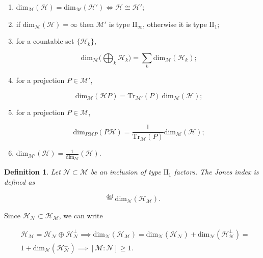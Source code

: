 \documentclass[a4paper,11pt]{article}
\newcommand{\eqdef}{\overset{\mathrm{def}}{=}}
\newtheorem{Definition}{Definition}[subsection]
\begin{document}
\begin{enumerate}
    \item $\mathrm{dim}_{\mathcal{M}} (\mathcal{H}) = \mathrm{dim}_{\mathcal{M}} (\mathcal{H}') \iff \mathcal{H} \cong \mathcal{H}'$;
    \item if $\mathrm{dim}_{\mathcal{M}} (\mathcal{H}) = \infty$ then $\mathcal{M}'$ is type $\mathrm{II}_{\infty}$, otherwise it is type $\mathrm{II}_1$;
    \item for a countable set $\{ \mathcal{H}_k \}$, 
    
    \begin{equation}
        \mathrm{dim}_{\mathcal{M}} \Big( \bigoplus_k \mathcal{H}_k \Big) = \sum_k \mathrm{dim}_{\mathcal{M}} (\mathcal{H}_k) \text{;}
    \end{equation}
    \item for a projection $P \in \mathcal{M}'$,
    
    \begin{equation}
        \mathrm{dim}_{\mathcal{M}} (\mathcal{H} P) = \mathrm{Tr}_{\mathcal{M}'}(P) \ \mathrm{dim}_{\mathcal{M}} (\mathcal{H}) \text{;}
    \end{equation}
    \item for a projection $P \in \mathcal{M}$,
    
    \begin{equation}
        \mathrm{dim}_{P \mathcal{M} P} (P \mathcal{H}) = \frac{1}{\mathrm{Tr}_{\mathcal{M}}(P)} \mathrm{dim}_{\mathcal{M}} (\mathcal{H}) \text{;}
    \end{equation}
    \item $\mathrm{dim}_{\mathcal{M}'}(\mathcal{H}) = \frac{1}{\mathrm{dim}_{\mathcal{M}}}(\mathcal{H})$.
\end{enumerate}

\begin{Definition}
    Let $\mathcal{N} \subset \mathcal{M}$ be an inclusion of type $\mathrm{II}_1$ factors. The \textnormal{Jones index} is defined as

    \begin{equation}
        [\mathcal{M} : \mathcal{N}] \eqdef \mathrm{dim}_{\mathcal{N}}(\mathcal{H}_{\mathcal{M}}) \text{.}
    \end{equation}
\end{Definition}

Since $\mathcal{H}_{\mathcal{N}} \subset \mathcal{H}_{\mathcal{M}}$, we can write

\begin{equation}
    \begin{split}
        &\mathcal{H}_{\mathcal{M}} = \mathcal{H}_{\mathcal{N}} \oplus \mathcal{H}_{\mathcal{N}}^{\perp} \implies \mathrm{dim}_{\mathcal{N}}(\mathcal{H}_{\mathcal{M}}) = \mathrm{dim}_{\mathcal{N}}(\mathcal{H}_{\mathcal{N}}) + \mathrm{dim}_{\mathcal{N}}(\mathcal{H}_{\mathcal{N}}^{\perp}) = \\
        &1 + \mathrm{dim}_{\mathcal{N}}(\mathcal{H}_{\mathcal{N}}^{\perp}) \implies [\mathcal{M} : \mathcal{N}] \geq 1 \text{.}
    \end{split}
\end{equation}
\end{document}
